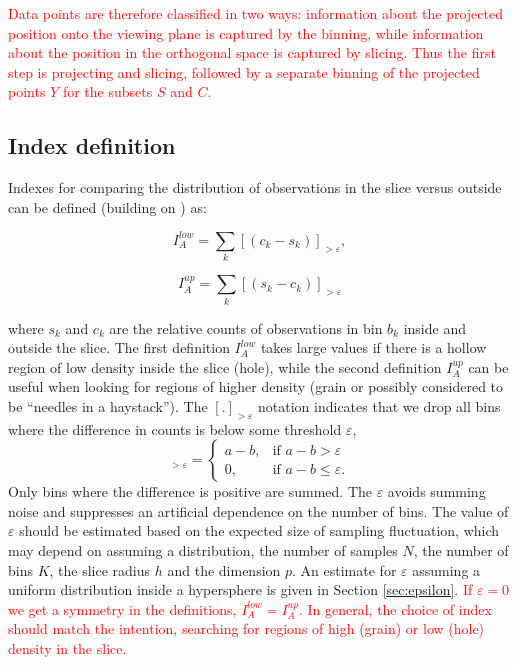\documentclass[]{interact}
\theoremstyle{plain}%
\theoremstyle{definition}
\theoremstyle{remark}
\begin{document}
\textcolor{red}{Data points are therefore classified in two ways: information about the projected position onto the viewing plane is captured by the binning, while information about the position in the orthogonal space is captured by slicing. Thus the first step is projecting and slicing, followed by a separate binning of the projected points $Y$ for the subsets $S$ and $C$.}

\hypertarget{index-definition}{%
\subsection{Index definition}\label{index-definition}}

Indexes for comparing the distribution of observations in the slice
versus outside can be defined (building on
\citet{doi:10.1198/1061860043119}) as:

\begin{equation}
I_A^{low} = \sum_{k}\left[\left(c_{k}-s_{k}\right)\right]_{>\varepsilon},
\label{eq:index}
\end{equation}

\begin{equation}
I_A^{up} = \sum_{k}\left[\left(s_{k}-c_{k}\right)\right]_{>\varepsilon}
\label{eq:indexup}
\end{equation}

\noindent where \(s_{k}\) and \(c_{k}\) are the relative counts of
observations in bin \(b_{k}\) inside and outside the slice. The first
definition \(I_A^{low}\) takes large values if there is a hollow region
of low density inside the slice (hole), while the second definition
\(I_A^{up}\) can be useful when looking for regions of higher density
(grain or possibly considered to be ``needles in a haystack''). The
\([.]_{>\varepsilon}\) notation indicates that we drop all bins where
the difference in counts is below some threshold \(\varepsilon\),
\begin{equation}
[a - b]_{>\varepsilon} = \begin{cases}
    a - b, & \text{if $a - b > \varepsilon$}\\
    0, & \text{if $a-b \leq \varepsilon$.}
  \end{cases}
\end{equation} Only bins where the difference is positive are summed.
The \(\varepsilon\) avoids summing noise and suppresses an artificial
dependence on the number of bins. The value of \(\varepsilon\) should be
estimated based on the expected size of sampling fluctuation, which may
depend on assuming a distribution, the number of samples \(N\), the
number of bins \(K\), the slice radius \(h\) and the dimension \(p\). An
estimate for \(\varepsilon\) assuming a uniform distribution inside a
hypersphere is given in Section \ref{sec:epsilon}.
\textcolor{red}{If $\varepsilon=0$ we get a symmetry in the definitions,  $I_A^{low}=I_A^{up}$. In general, the choice of index should match the intention, searching for regions of high (grain) or low (hole) density in the slice.}
\end{document}
